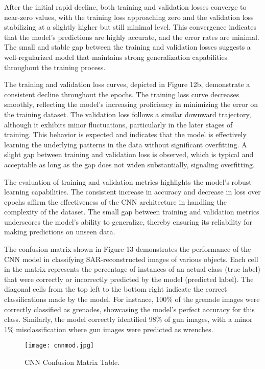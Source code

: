 \documentclass[journal,article,submit,pdftex,moreauthors]{Definitions/mdpi}
\begin{document}
After the initial rapid decline, both training and validation losses converge to near-zero values, with the training loss approaching zero and the validation loss stabilizing at a slightly higher but still minimal level. This convergence indicates that the model's predictions are highly accurate, and the error rates are minimal. The small and stable gap between the training and validation losses suggests a well-regularized model that maintains strong generalization capabilities throughout the training process. 

The training and validation loss curves, depicted in Figure 12b, demonstrate a consistent decline throughout the epochs. The training loss curve decreases smoothly, reflecting the model's increasing proficiency in minimizing the error on the training dataset. The validation loss follows a similar downward trajectory, although it exhibits minor fluctuations, particularly in the later stages of training. This behavior is expected and indicates that the model is effectively learning the underlying patterns in the data without significant overfitting. A slight gap between training and validation loss is observed, which is typical and acceptable as long as the gap does not widen substantially, signaling overfitting.



The evaluation of training and validation metrics highlights the model's robust learning capabilities. The consistent increase in accuracy and decrease in loss over epochs affirm the effectiveness of the CNN architecture in handling the complexity of the dataset. The small gap between training and validation metrics underscores the model's ability to generalize, thereby ensuring its reliability for making predictions on unseen data.

The confusion matrix shown in Figure 13 demonstrates the performance of the CNN model in classifying SAR-reconstructed images of various objects. Each cell in the matrix represents the percentage of instances of an actual class (true label) that were correctly or incorrectly predicted by the model (predicted label). The diagonal cells from the top left to the bottom right indicate the correct classifications made by the model. For instance, 100\% of the grenade images were correctly classified as grenades, showcasing the model's perfect accuracy for this class. Similarly, the model correctly identified 98\% of gun images, with a minor 1\% misclassification where gun images were predicted as wrenches.
\begin{figure}[h]
  \centering
  \texttt{[image: cnnmod.jpg]}
  \caption{CNN Confusion Matrix Table.}
  \label{Figure:}
\end{figure}
\end{document}
